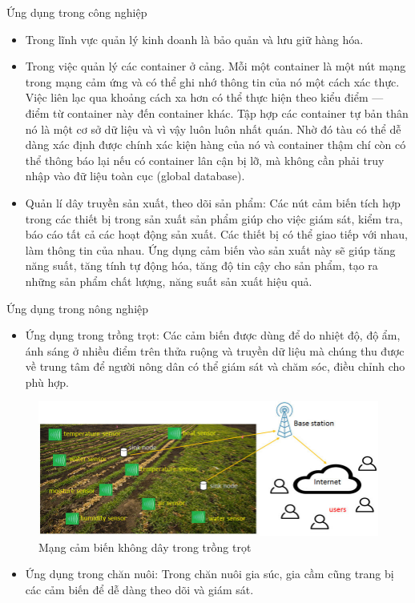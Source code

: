 \documentclass{report}
\begin{document}
Ứng dụng trong công nghiệp
\begin{itemize}
\item Trong lĩnh vực quản lý kinh doanh là bảo quản và lưu giữ hàng hóa.
\item Trong việc quản lý các container ở cảng. Mỗi một container là một nút mạng trong mạng cảm ứng và có thể ghi nhớ thông tin của nó một cách xác thực. Việc liên lạc qua khoảng cách xa hơn có thể thực hiện theo kiểu điểm — điểm từ container này đến container khác. Tập hợp các container tự bản thân nó là một cơ sở dữ liệu và vì vậy luôn luôn nhất quán. Nhờ đó tàu có thể dễ dàng xác định được chính xác kiện hàng của nó và container thậm chí còn có thể thông báo lại nếu có container lân cận bị lỡ, mà không cần phải truy nhập vào đữ liệu toàn cục (global database).
\item Quản lí dây truyền sản xuất, theo dõi sản phẩm: Các nút cảm biến tích hợp trong các
thiết bị trong sản xuất sản phẩm giúp cho việc giám sát, kiểm tra, báo cáo tất cả các hoạt
động sản xuất. Các thiết bị có thể giao tiếp với nhau, làm thông tin của nhau. Ứng dụng cảm
biến vào sản xuất này sẽ giúp tăng năng suất, tăng tính tự động hóa, tăng độ tin cậy cho sản
phẩm, tạo ra những sản phẩm chất lượng, năng suất sản xuất hiệu quả.
\end{itemize}
\newpage
Ứng dụng trong nông nghiệp
\begin{itemize}
\item Ứng dụng trong trồng trọt: Các cảm biến được dùng để do nhiệt độ, độ ẩm, ánh sáng ở
nhiều điểm trên thửa ruộng và truyền dữ liệu mà chúng thu được về trung tâm để người nông
dân có thể giám sát và chăm sóc, điều chỉnh cho phù hợp.
\end{itemize}
\begin{figure}[h]
	\centering
	\includegraphics[scale = 0.5]{fig9.png}
	\caption{Mạng cảm biến không dây trong trồng trọt}
	\label{fig:Graph9}
\end{figure}
\begin{itemize}
\item Ứng dụng trong chăn nuôi: Trong chăn nuôi gia súc, gia cầm cũng trang bị các cảm biến
để dễ dàng theo dõi và giám sát.
\end{itemize}
\end{document}
